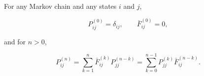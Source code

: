 For any Markov chain and any states $i$ and $j$,

$$P_{ij}^{(0)} = \delta_{ij}, \qquad \bar{F}_{ij}^{(0)} = 0,$$

and for $n > 0$,

$$P_{ij}^{(n)} = \sum_{k=1}^{n} \bar{F}_{ij}^{(k)} P_{jj}^{(n-k)} = \sum_{k=0}^{n-1} P_{jj}^{(k)} \bar{F}_{ij}^{(n-k)}.$$
